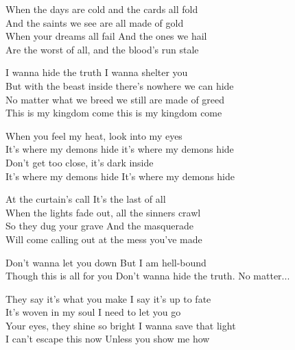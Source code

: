 \ve{}
When the days are cold and the cards all fold\\
And the saints we see are all made of gold\\
When your dreams all fail And the ones we hail\\
Are the worst of all, and the blood's run stale

\re{*}
I wanna hide the truth I wanna shelter you\\
But with the beast inside there's nowhere we can hide\\
No matter what we breed we still are made of greed\\
This is my kingdom come this is my kingdom come

\cho{}
When you feel my heat, look into my eyes\\
It's where my demons hide it's where my demons hide\\
Don't get too close, it's dark inside\\
It's where my demons hide It's where my demons hide

\ve{}
At the curtain's call It's the last of all\\
When the lights fade out, all the sinners crawl\\
So they dug your grave And the masquerade\\
Will come calling out at the mess you've made

\re{*}
Don't wanna let you down But I am hell-bound\\
Though this is all for you Don't wanna hide the truth. No matter...

\cho{}

\ve{}
They say it's what you make I say it's up to fate\\
It's woven in my soul I need to let you go\\
Your eyes, they shine so bright I wanna save that light\\
I can't escape this now Unless you show me how

\cho{}
\esong{}